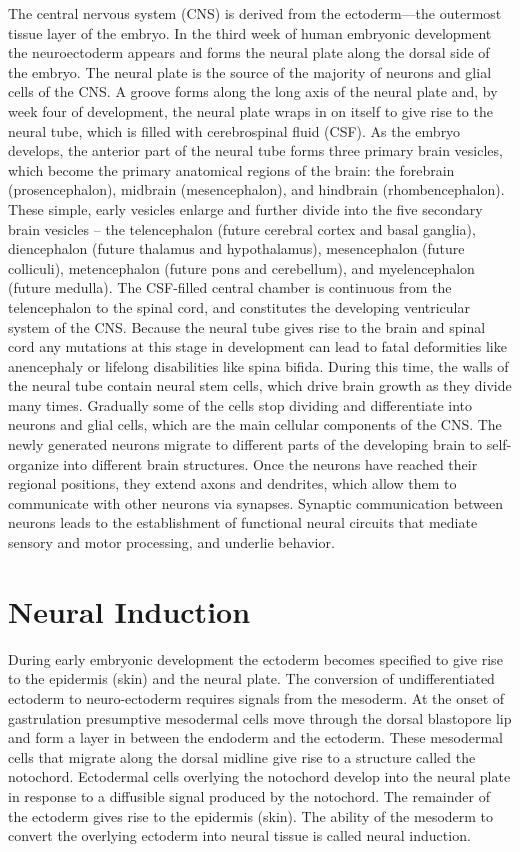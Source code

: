 The central nervous system (CNS) is derived from the ectoderm---the outermost tissue layer of the embryo. In the third week of human embryonic development the neuroectoderm appears and forms the neural plate along the dorsal side of the embryo. The neural plate is the source of the majority of neurons and glial cells of the CNS. A groove forms along the long axis of the neural plate and, by week four of development, the neural plate wraps in on itself to give rise to the neural tube, which is filled with cerebrospinal fluid (CSF). As the embryo develops, the anterior part of the neural tube forms three primary brain vesicles, which become the primary anatomical regions of the brain: the forebrain (prosencephalon), midbrain (mesencephalon), and hindbrain (rhombencephalon). These simple, early vesicles enlarge and further divide into the five secondary brain vesicles -- the telencephalon (future cerebral cortex and basal ganglia), diencephalon (future thalamus and hypothalamus), mesencephalon (future colliculi), metencephalon (future pons and cerebellum), and myelencephalon (future medulla). The CSF-filled central chamber is continuous from the telencephalon to the spinal cord, and constitutes the developing ventricular system of the CNS. Because the neural tube gives rise to the brain and spinal cord any mutations at this stage in development can lead to fatal deformities like anencephaly or lifelong disabilities like spina bifida. During this time, the walls of the neural tube contain neural stem cells, which drive brain growth as they divide many times. Gradually some of the cells stop dividing and differentiate into neurons and glial cells, which are the main cellular components of the CNS. The newly generated neurons migrate to different parts of the developing brain to self-organize into different brain structures. Once the neurons have reached their regional positions, they extend axons and dendrites, which allow them to communicate with other neurons via synapses. Synaptic communication between neurons leads to the establishment of functional neural circuits that mediate sensory and motor processing, and underlie behavior.

\hypertarget{neural-induction}{%
\section{Neural Induction}\label{neural-induction}}

During early embryonic development the ectoderm becomes specified to give rise to the epidermis (skin) and the neural plate. The conversion of undifferentiated ectoderm to neuro-ectoderm requires signals from the mesoderm. At the onset of gastrulation presumptive mesodermal cells move through the dorsal blastopore lip and form a layer in between the endoderm and the ectoderm. These mesodermal cells that migrate along the dorsal midline give rise to a structure called the notochord. Ectodermal cells overlying the notochord develop into the neural plate in response to a diffusible signal produced by the notochord. The remainder of the ectoderm gives rise to the epidermis (skin). The ability of the mesoderm to convert the overlying ectoderm into neural tissue is called neural induction.

